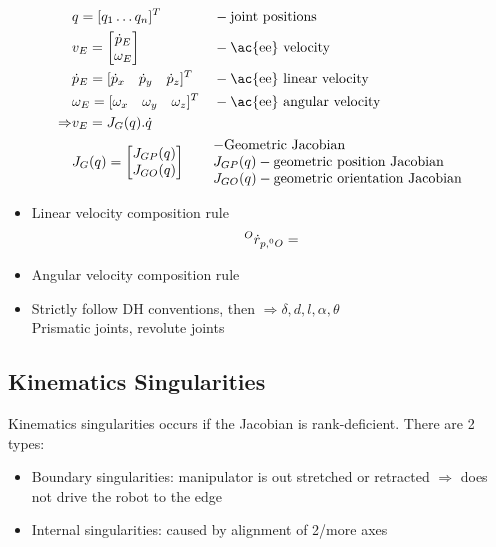 \begin{align}
	&q = [q_1 \dots q_n]^T &&-\text{joint positions}\\
	&v_E = \begin{bmatrix}
		\dot{p}_E\\
		\omega_E
	\end{bmatrix} &&-\text{\ac{ee} velocity}\\
	&\dot{p}_E = [\dot{p}_x \quad \dot{p}_y \quad \dot{p}_z]^T &&-\text{\ac{ee} linear velocity}\\
	&\omega_E = [\omega_x \quad \omega_y \quad \omega_z]^T &&-\text{\ac{ee} angular velocity}\\
	\Rightarrow & v_E = J_G(q).\dot{q}\\
	&J_G(q) = \begin{bmatrix}
		J_{GP}(q)\\
		J_{GO}(q)
	\end{bmatrix} && \begin{matrix*}[l]
	-\text{Geometric Jacobian}\\
	J_{GP}(q) - \text{geometric position Jacobian}\\
	J_{GO}(q) - \text{geometric orientation Jacobian}
\end{matrix*}
\end{align}

\begin{itemize}
	\item Linear velocity composition rule
	\begin{align}
		\prescript{O}{}{\dot{r}_{p, \prescript{0}{}{O}}} = 
	\end{align}
	\item Angular velocity composition rule
	\item Strictly follow \ac{DH} conventions, then $\Rightarrow \delta, d, l, \alpha, \theta$\\
	Prismatic joints, revolute joints
\end{itemize}

\subsection{Kinematics Singularities}
Kinematics singularities occurs if the Jacobian is rank-deficient. There are 2 types:
\begin{itemize}
	\item Boundary singularities: manipulator is out stretched or retracted $\Rightarrow$ does not drive the robot to the edge
	\item Internal singularities: caused by alignment of 2/more axes
\end{itemize}

